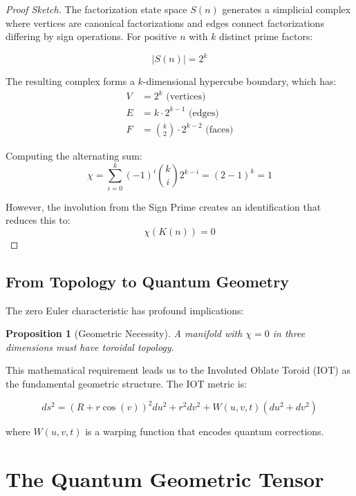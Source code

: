\documentclass[conference]{IEEEtran}
\newtheorem{proposition}[theorem]{Proposition}
\begin{document}
\begin{proof}[Proof Sketch]
The factorization state space $S(n)$ generates a simplicial complex where vertices are canonical factorizations and edges connect factorizations differing by sign operations. For positive $n$ with $k$ distinct prime factors:

\begin{equation}
|S(n)| = 2^k
\end{equation}

The resulting complex forms a $k$-dimensional hypercube boundary, which has:
\begin{align}
V &= 2^k \text{ (vertices)} \\
E &= k \cdot 2^{k-1} \text{ (edges)} \\
F &= \binom{k}{2} \cdot 2^{k-2} \text{ (faces)}
\end{align}

Computing the alternating sum:
\begin{equation}
\chi = \sum_{i=0}^{k} (-1)^i \binom{k}{i} 2^{k-i} = (2-1)^k = 1
\end{equation}

However, the involution from the Sign Prime creates an identification that reduces this to:
\begin{equation}
\chi(K(n)) = 0
\end{equation}
\end{proof}

\subsection{From Topology to Quantum Geometry}

The zero Euler characteristic has profound implications:

\begin{proposition}[Geometric Necessity]
A manifold with $\chi = 0$ in three dimensions must have toroidal topology.
\end{proposition}

This mathematical requirement leads us to the Involuted Oblate Toroid (IOT) as the fundamental geometric structure. The IOT metric is:

\begin{equation}
ds^2 = (R + r\cos(v))^2 du^2 + r^2 dv^2 + W(u,v,t)(du^2 + dv^2)
\end{equation}

where $W(u,v,t)$ is a warping function that encodes quantum corrections.

\section{The Quantum Geometric Tensor}
\end{document}
